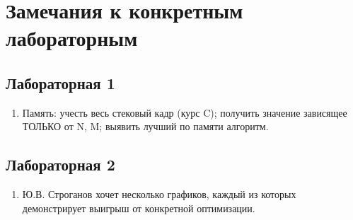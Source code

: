 \chapter{Замечания к конкретным лабораторным}

\section{Лабораторная 1}
\begin{enumerate}
	\item Память: учесть весь стековый кадр (курс C); получить значение зависящее ТОЛЬКО от N, M; выявить лучший по памяти алгоритм.
\end{enumerate}

\section{Лабораторная 2}
\begin{enumerate}
	\item Ю.В. Строганов хочет несколько графиков, каждый из которых демонстрирует выигрыш от конкретной оптимизации.
\end{enumerate}






